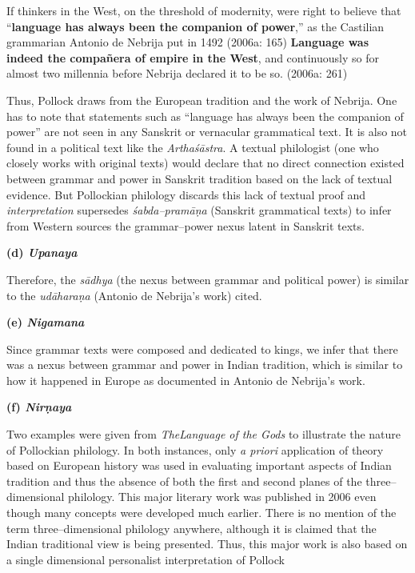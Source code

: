\begin{myquote}
If thinkers in the West, on the threshold of modernity, were right to believe that “\textbf{language has always been the companion of power},” as the Castilian grammarian Antonio de Nebrija put in 1492 (2006a: 165) \textbf{Language was indeed the compañera of empire in the West}, and continuously so for almost two millennia before Nebrija declared it to be so. (2006a: 261)
\end{myquote}

Thus, Pollock draws from the European tradition and the work of Nebrija. One has to note that statements such as “language has always been the companion of power” are not seen in any Sanskrit or vernacular grammatical text. It is also not found in a political text like the \textit{Arthaśāstra}. A textual philologist (one who closely works with original texts) would declare that no direct connection existed between grammar and power in Sanskrit tradition based on the lack of textual evidence. But Pollockian philology discards this lack of textual proof and \textit{interpretation} supersedes \textit{śabda–pramāṇa} (Sanskrit grammatical texts) to infer from Western sources the grammar–power nexus latent in Sanskrit texts.

\textbf{(d) \textit{Upanaya}}

Therefore, the \textit{sādhya} (the nexus between grammar and political power) is similar to the \textit{udāharaṇa} (Antonio de Nebrija’s work) cited.

\textbf{(e) \textit{Nigamana}}

Since grammar texts were composed and dedicated to kings, we infer that there was a nexus between grammar and power in Indian tradition, which is similar to how it happened in Europe as documented in Antonio de Nebrija’s work.

\textbf{(f) \textit{Nirṇaya}}

Two examples were given from \textit{TheLanguage of the Gods} to illustrate the nature of Pollockian philology. In both instances, only \textit{a priori} application of theory based on European history was used in evaluating important aspects of Indian tradition and thus the absence of both the first and second planes of the three–dimensional philology. This major literary work was published in 2006 even though many concepts were developed much earlier. There is no mention of the term three–dimensional philology anywhere, although it is claimed that the Indian traditional view is being presented. Thus, this major work is also based on a single dimensional personalist interpretation of Pollock


